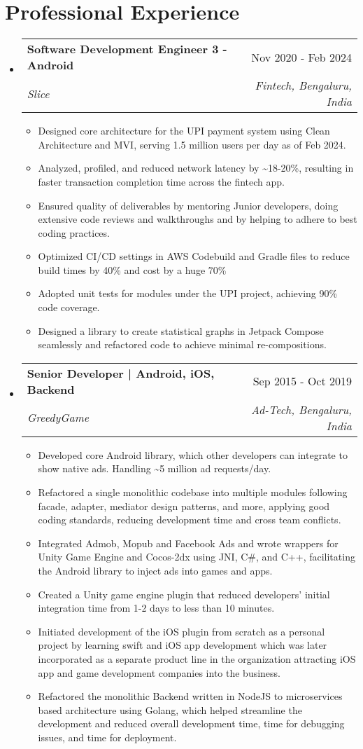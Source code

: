 \documentclass[11pt,a4paper]{article}
\makeatletter
\newcommand{\resumeItem}[1]{\item\small{#1}}
\newcommand{\resumeSubheading}[4]{
  \vspace{-1pt}\item
    \begin{tabular*}{0.97\textwidth}[t]{l@{\extracolsep{\fill}}r}
      \textbf{#1} & #2 \\
      \textit{\small#3} & \textit{\small #4} \\
    \end{tabular*}\vspace{-5pt}
}
\makeatother
\begin{document}
\section{Professional Experience}
\begin{itemize}[leftmargin=0.15in, label={}]
\resumeSubheading
  {Software Development Engineer 3 - Android}{Nov 2020 - Feb 2024}
  {Slice}{Fintech, Bengaluru, India}
\begin{itemize}[leftmargin=0.3in]
  \resumeItem{Designed core architecture for the UPI payment system using Clean Architecture and MVI, serving 1.5 million users per day as of Feb 2024.}
  \resumeItem{Analyzed, profiled, and reduced network latency by \textasciitilde{}18-20\%, resulting in faster transaction completion time across the fintech app.}
  \resumeItem{Ensured quality of deliverables by mentoring Junior developers, doing extensive code reviews and walkthroughs and by helping to adhere to best coding practices.}
  \resumeItem{Optimized CI/CD settings in AWS Codebuild and Gradle files to reduce build times by 40\% and cost by a huge 70\%}
  \resumeItem{Adopted unit tests for modules under the UPI project, achieving 90\% code coverage.}
  \resumeItem{Designed a library to create statistical graphs in Jetpack Compose seamlessly and refactored code to achieve minimal re-compositions.}
\end{itemize}

\resumeSubheading
  {Senior Developer | Android, iOS, Backend}{Sep 2015 - Oct 2019}
  {GreedyGame}{Ad-Tech, Bengaluru, India}
\begin{itemize}[leftmargin=0.3in]
  \resumeItem{Developed core Android library, which other developers can integrate to show native ads. Handling \textasciitilde{}5 million ad requests/day.}
  \resumeItem{Refactored a single monolithic codebase into multiple modules following facade, adapter, mediator design patterns, and more, applying good coding standards, reducing development time and cross team conflicts.}
  \resumeItem{Integrated Admob, Mopub and Facebook Ads and wrote wrappers for Unity Game Engine and Cocos-2dx using JNI, C\#, and C++, facilitating the Android library to inject ads into games and apps.}
  \resumeItem{Created a Unity game engine plugin that reduced developers' initial integration time from 1-2 days to less than 10 minutes.}
  \resumeItem{Initiated development of the iOS plugin from scratch as a personal project by learning swift and iOS app development which was later incorporated as a separate product line in the organization attracting iOS app and game development companies into the business.}
  \resumeItem{Refactored the monolithic Backend written in NodeJS to microservices based architecture using Golang, which helped streamline the development and reduced overall development time, time for debugging issues, and time for deployment.}
\end{itemize}


\end{itemize}
\end{document}
